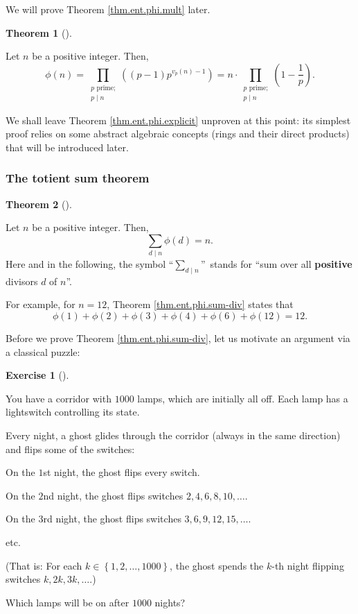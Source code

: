 \documentclass[numbers=enddot,12pt,final,onecolumn,notitlepage]{scrartcl}%
\newcounter{exer}
\numberwithin{exer}{subsection}
\theoremstyle{definition}
\newtheorem{theo}{Theorem}[subsection]
\newenvironment{theorem}[1][]
{\begin{theo}[#1]\begin{leftbar}}
{\end{leftbar}\end{theo}}
\newtheorem{exmp}[exer]{Exercise}
\newenvironment{exercise}[1][]
{\begin{exmp}[#1]\begin{leftbar}}
{\end{leftbar}\end{exmp}}
\let\sumnonlimits\sum
\let\prodnonlimits\prod
\renewcommand{\sum}{\sumnonlimits\limits}
\renewcommand{\prod}{\prodnonlimits\limits}
\begin{document}
We will prove Theorem \ref{thm.ent.phi.mult} later.

\begin{theorem}
\label{thm.ent.phi.explicit}Let $n$ be a positive integer. Then,%
\[
\phi\left(  n\right)  =\prod_{\substack{p\text{ prime;}\\p\mid n}}\left(
\left(  p-1\right)  p^{v_{p}\left(  n\right)  -1}\right)  =n\cdot
\prod_{\substack{p\text{ prime;}\\p\mid n}}\left(  1-\dfrac{1}{p}\right)  .
\]

\end{theorem}

We shall leave Theorem \ref{thm.ent.phi.explicit} unproven at this point: its
simplest proof relies on some abstract algebraic concepts (rings and their
direct products) that will be introduced later.

\subsubsection{The totient sum theorem}

\begin{theorem}
\label{thm.ent.phi.sum-div}Let $n$ be a positive integer. Then,%
\[
\sum_{d\mid n}\phi\left(  d\right)  =n.
\]
Here and in the following, the symbol \textquotedblleft$\sum_{d\mid n}%
$\textquotedblright\ stands for \textquotedblleft sum over all
\textbf{positive} divisors $d$ of $n$\textquotedblright.
\end{theorem}

For example, for $n=12$, Theorem \ref{thm.ent.phi.sum-div} states that%
\[
\phi\left(  1\right)  +\phi\left(  2\right)  +\phi\left(  3\right)
+\phi\left(  4\right)  +\phi\left(  6\right)  +\phi\left(  12\right)  =12.
\]


Before we prove Theorem \ref{thm.ent.phi.sum-div}, let us motivate an argument
via a classical puzzle:

\begin{exercise}
\label{exe.ent.phi.ghosts}You have a corridor with $1000$ lamps, which are
initially all off. Each lamp has a lightswitch controlling its state.

Every night, a ghost glides through the corridor (always in the same
direction) and flips some of the switches:

On the $1$st night, the ghost flips every switch.

On the $2$nd night, the ghost flips switches $2,4,6,8,10,\ldots$.

On the $3$rd night, the ghost flips switches $3,6,9,12,15,\ldots$.

etc.

(That is: For each $k\in\left\{  1,2,\ldots,1000\right\}  $, the ghost spends
the $k$-th night flipping switches $k,2k,3k,\ldots$.)

Which lamps will be on after $1000$ nights?
\end{exercise}
\end{document}
